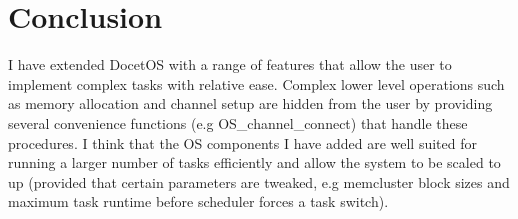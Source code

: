 \documentclass[12pt,a4paper]{article}
\begin{document}
\section{Conclusion}
I have extended DocetOS with a range of features that allow the user to implement complex tasks with relative ease. Complex lower level operations such as memory allocation and channel setup are hidden from the user by providing several convenience functions (e.g OS\_channel\_connect) that handle these procedures. I think that the OS components I have added are well suited for running a larger number of tasks efficiently and allow the system to be scaled to up (provided that certain parameters are tweaked, e.g memcluster block sizes and maximum task runtime before scheduler forces a task switch).
\end{document}

